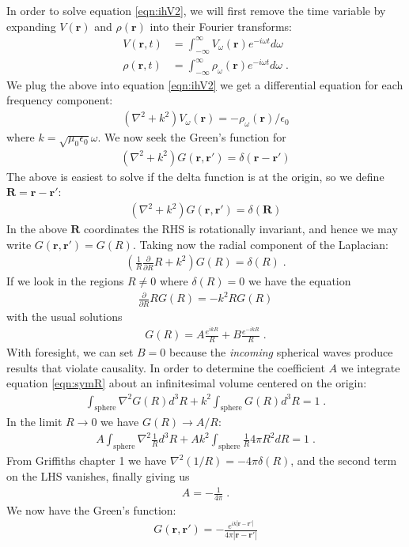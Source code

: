 \documentclass[12pt]{article}
\renewcommand{\vec}[1]{\boldsymbol{#1}}
\begin{document}
In order to solve equation \ref{eqn:ihV2}, we will first remove the time variable by expanding $V(\vec{r})$ and
$\rho(\vec{r})$ into their Fourier transforms:
\begin{align}
V(\vec{r}, t) &= \int_{-\infty}^{\infty} V_{\omega}(\vec{r})e^{- i\omega t} d\omega \\
    \rho(\vec{r}, t) &= \int_{-\infty}^{\infty} \rho_{\omega}(\vec{r})e^{- i\omega t} d\omega \;.
\end{align}
We plug the above into equation \ref{eqn:ihV2} we get a differential equation for each frequency component:
\begin{align}
(\nabla^2 + k^2) V_\omega(\vec{r}) = -\rho_\omega (\vec{r})/\epsilon_0
\end{align}
where $k = \sqrt{\mu_0\epsilon_0}\omega$.  We now seek the Green's function for
\begin{align}
 (\nabla^2 + k^2)G(\vec{r}, \vec{r}') = \delta(\vec{r}-\vec{r}')
\end{align}
The above is easiest to solve if the delta function is at the origin, so we define $\vec{R} = \vec{r}-\vec{r}'$:
\begin{align}
 (\nabla^2 + k^2)G(\vec{r}, \vec{r}') = \delta(\vec{R})
\end{align}
In the above $\vec{R}$ coordinates the RHS is rotationally invariant, and hence we may write 
$G(\vec{r}, \vec{r}') = G(R)$.  Taking now the radial component of the Laplacian:
\begin{align}\label{eqn:symR}
\left(\frac{1}{R}\frac{\partial}{\partial R}R + k^2\right)G(R) = \delta(R) \;.
\end{align}
If we look in the regions $R \ne 0$ where $\delta(R)=0$ we have the equation
\begin{align}
\frac{\partial}{\partial R}RG(R) =- k^2R G(R)  
\end{align}
with the usual solutions
\begin{align}
 G(R) = A \frac{e^{ikR}}{R} + B \frac{e^{-ikR}}{R} \;.
\end{align}
With foresight, we can set $B=0$ because the \emph{incoming} spherical waves produce results
that violate causality.  In order to determine the coefficient $A$ we integrate equation \ref{eqn:symR}
about an infinitesimal volume centered on the origin:
\begin{align}
\int_\text{sphere}\nabla^2 G(R) d^3R  + k^2 \int_\text{sphere} G(R) d^3R = 1 \;.
\end{align}
In the limit $R\rightarrow 0$ we have $G(R) \rightarrow A/R$:
\begin{align}
A \int_\text{sphere}\nabla^2 \frac{1}{R} d^3R  + A k^2 \int_\text{sphere} \frac{1}{R} 4\pi R^2dR = 1 \;.
\end{align}
From Griffiths chapter 1 we have $\nabla^2 (1/R) = -4\pi \delta(R)$, and the second term on the LHS 
vanishes, finally giving us
\begin{align}
 A = -\frac{1}{4\pi} \;.
\end{align}
We now have the Green's function:
\begin{align}
 G(\vec{r}, \vec{r}') = - \frac{e^{ik|\vec{r}-\vec{r}'|}}{4\pi |\vec{r}-\vec{r}'|}
\end{align}
\end{document}
